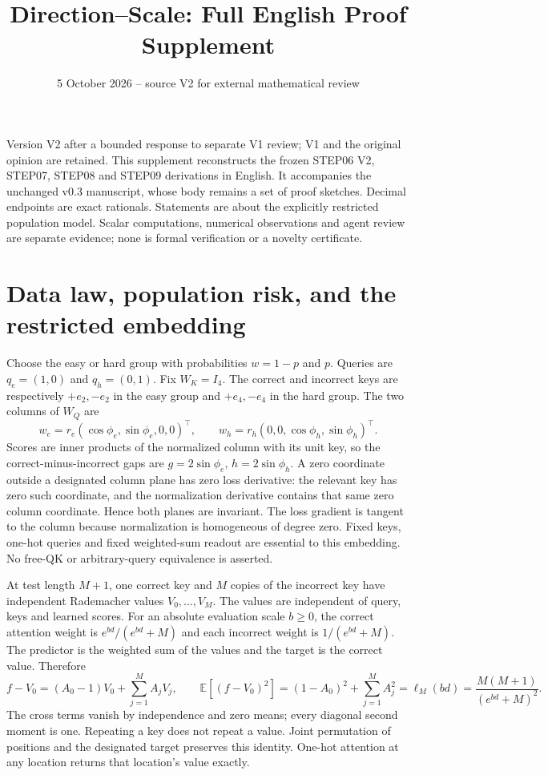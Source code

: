 \documentclass[11pt,a4paper]{article}
\title{Direction--Scale: Full English Proof Supplement}
\author{}
\date{5 October 2026 -- source V2 for external mathematical review}
\begin{document}
\maketitle
\tableofcontents


Version V2 after a bounded response to separate V1 review; V1 and the original opinion are retained. This supplement reconstructs the frozen STEP06 V2, STEP07, STEP08 and STEP09 derivations in English. It accompanies the unchanged v0.3 manuscript, whose body remains a set of proof sketches. Decimal endpoints are exact rationals. Statements are about the explicitly restricted population model. Scalar computations, numerical observations and agent review are separate evidence; none is formal verification or a novelty certificate.

\section{Data law, population risk, and the restricted embedding}

Choose the easy or hard group with probabilities $w=1-p$ and $p$. Queries are $q_e=(1,0)$ and $q_h=(0,1)$. Fix $W_K=I_4$. The correct and incorrect keys are respectively $+e_2,-e_2$ in the easy group and $+e_4,-e_4$ in the hard group. The two columns of $W_Q$ are
\[
 w_e=r_e(\cos\phi_e,\sin\phi_e,0,0)^\top,\qquad
 w_h=r_h(0,0,\cos\phi_h,\sin\phi_h)^\top .
\]
Scores are inner products of the normalized column with its unit key, so the correct-minus-incorrect gaps are $g=2\sin\phi_e$, $h=2\sin\phi_h$. A zero coordinate outside a designated column plane has zero loss derivative: the relevant key has zero such coordinate, and the normalization derivative contains that same zero column coordinate. Hence both planes are invariant. The loss gradient is tangent to the column because normalization is homogeneous of degree zero. Fixed keys, one-hot queries and fixed weighted-sum readout are essential to this embedding. No free-QK or arbitrary-query equivalence is asserted.

At test length $M+1$, one correct key and $M$ copies of the incorrect key have independent Rademacher values $V_0,\ldots,V_M$. The values are independent of query, keys and learned scores. For an absolute evaluation scale $b\ge0$, the correct attention weight is $e^{bd}/(e^{bd}+M)$ and each incorrect weight is $1/(e^{bd}+M)$. The predictor is the weighted sum of the values and the target is the correct value. Therefore
\[
 f-V_0=(A_0-1)V_0+\sum_{j=1}^M A_jV_j,\qquad
 \mathbb E[(f-V_0)^2]=(1-A_0)^2+\sum_{j=1}^M A_j^2
 =\ell_M(bd)=\frac{M(M+1)}{(e^{bd}+M)^2}.
\]
The cross terms vanish by independence and zero means; every diagonal second moment is one. Repeating a key does not repeat a value. Joint permutation of positions and the designated target preserves this identity. One-hot attention at any location returns that location's value exactly.
\end{document}
